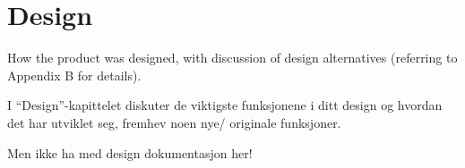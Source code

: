 \chapter{Design}

\minitoc

How the product was designed,   with    discussion  of  design  alternatives
(referring  to  Appendix    B   for details).

I “Design”-kapittelet diskuter de viktigste funksjonene i ditt
design og hvordan det har utviklet seg, fremhev noen nye/
originale funksjoner.

Men ikke ha med design dokumentasjon her!

\clearpage
